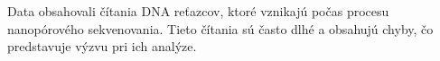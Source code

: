 Data obsahovali čítania DNA reťazcov, ktoré vznikajú počas procesu nanopórového sekvenovania.
Tieto čítania sú často dlhé a obsahujú chyby, čo predstavuje výzvu pri ich analýze.
